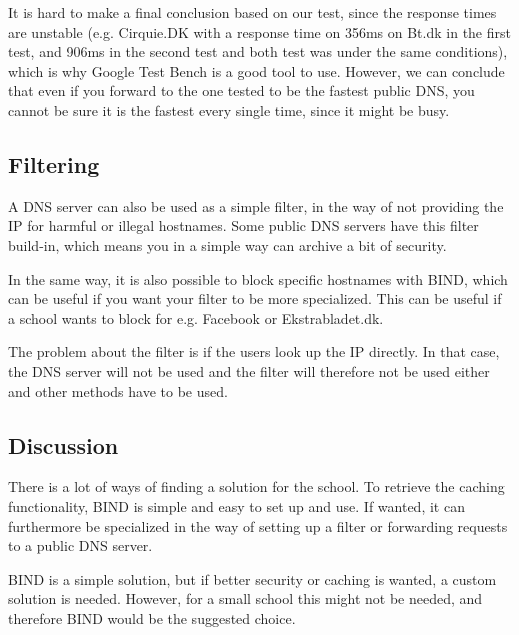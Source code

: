 \documentclass[Preamble]{subfiles}
\begin{document}
It is hard to make a final conclusion based on our test, since the response times are unstable (e.g. Cirquie.DK with a response time on 356ms on Bt.dk in the first test, and 906ms in the second test and both test was under the same conditions), which is why Google Test Bench is a good tool to use. However, we can conclude that even if you forward to the one tested to be the fastest public DNS, you cannot be sure it is the fastest every single time, since it might be busy.

\subsection{Filtering}
A DNS server can also be used as a simple filter, in the way of not providing the IP for harmful or illegal hostnames. Some public DNS servers have this filter build-in, which means you in a simple way can archive a bit of security.

In the same way, it is also possible to block specific hostnames with BIND, which can be useful if you want your filter to be more specialized. This can be useful if a school wants to block for e.g. Facebook or Ekstrabladet.dk.

The problem about the filter is if the users look up the IP directly. In that case, the DNS server will not be used and the filter will therefore not be used either and other methods have to be used.

\subsection{Discussion}
There is a lot of ways of finding a solution for the school. To retrieve the caching functionality, BIND is simple and easy to set up and use. If wanted, it can furthermore be specialized in the way of setting up a filter or forwarding requests to a public DNS server.  

BIND is a simple solution, but if better security or caching is wanted, a custom solution is needed. However, for a small school this might not be needed, and therefore BIND would be the suggested choice.
\end{document}
